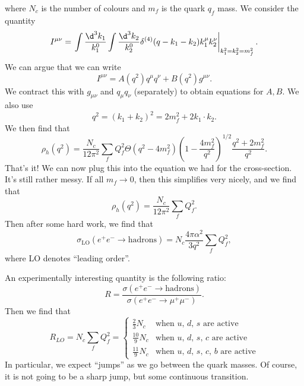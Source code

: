 \documentclass[a4paper]{article}
\begin{document}
where $N_c$ is the number of colours and $m_f$ is the quark $q_f$ mass. We consider the quantity
\[
  I^{\mu\nu} = \left.\int \frac{\d^3 k_1}{k_1^0} \int \frac{\d^3 k_2}{k_2^0} \delta^{(4)}(q - k_1 - k_2) k_1^\mu k_2^\nu\right|_{k_1^2 = k_2^2 = m_f^2}.
\]
We can argue that we can write
\[
  I^{\mu\nu} = A(q^2) q^\mu q^\nu + B(q^2) g^{\mu\nu}.
\]
We contract this with $g_{\mu\nu}$ and $q_\mu q_\nu$ (separately) to obtain equations for $A, B$. We also use
\[
  q^2 = (k_1 + k_2)^2 = 2 m_f^2 + 2 k_1 \cdot k_2.
\]
We then find that
\[
  \rho_h(q^2) = \frac{N_c}{12 \pi^2} \sum_f Q_f^2 \Theta(q^2 - 4 m_f^2)\left(1 - \frac{4 m_f^2}{q^2}\right)^{1/2} \frac{q^2 + 2 m_f^2}{q^2}.
\]
That's it! We can now plug this into the equation we had for the cross-section. It's still rather messy. If all $m_f \to 0$, then this simplifies very nicely, and we find that
\[
  \rho_h(q^2) = \frac{N_c}{12 \pi^2} \sum_f Q_f^2.
\]
Then after some hard work, we find that
\[
  \sigma_{\mathrm{LO}}(e^+ e^- \to \mathrm{hadrons}) = N_c \frac{4\pi \alpha^2}{3q^2} \sum_f Q_f^2,
\]
where LO denotes ``leading order''.

An experimentally interesting quantity is the following ratio:
\[
  R = \frac{\sigma(e^+ e^- \to \mathrm{hadrons})}{\sigma(e^+ e^- \to \mu^+ \mu^-)}.
\]
Then we find that
\[
  R_{LO} = N_c \sum_f Q_f^2 =
  \begin{cases}
    \frac{2}{3} N_c & \text{when $u$, $d$, $s$ are active}\\
    \frac{10}{9} N_c & \text{when $u$, $d$, $s$, $c$ are active}\\
    \frac{11}{9} N_c & \text{when $u$, $d$, $s$, $c$, $b$ are active}
  \end{cases}
\]
In particular, we expect ``jumps'' as we go between the quark masses. Of course, it is not going to be a sharp jump, but some continuous transition.
\end{document}
